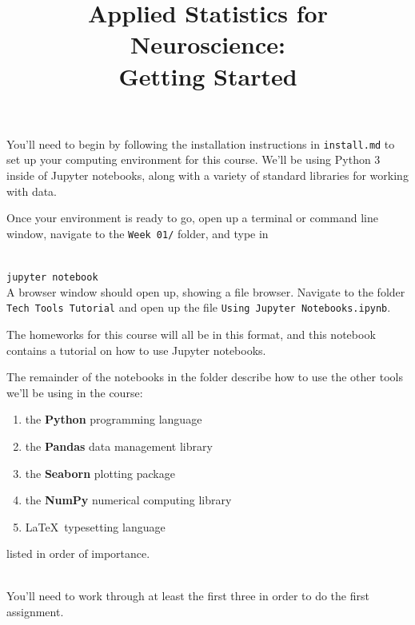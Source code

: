 \documentclass[twoside]{article}
\title{Applied Statistics for Neuroscience:\\
	Getting Started}
\begin{document}
\maketitle

You'll need to begin by following the installation instructions in
\texttt{install.md}
to set up your computing environment for this course.
We'll be using Python 3 inside of Jupyter notebooks,
along with a variety of standard libraries for working with data.

Once your environment is ready to go,
open up a terminal or command line window,
navigate to the \texttt{Week 01/} folder,
and type in

\ \\
\texttt{jupyter notebook}
\ \\

A browser window should open up, showing a file browser.
Navigate to the folder \texttt{Tech Tools Tutorial}
and open up the file
\texttt{Using Jupyter Notebooks.ipynb}.

The homeworks for this course will all be in this format,
and this notebook contains a tutorial on how to use Jupyter notebooks.

The remainder of the notebooks in the folder describe how
to use the other tools we'll be using in the course:

\begin{enumerate}
\item the \textbf{Python} programming language
\item the \textbf{Pandas} data management library
\item the \textbf{Seaborn} plotting package
\item the \textbf{NumPy} numerical computing library
\item \LaTeX \ typesetting language
\end{enumerate}

listed in order of importance.

\ \\

You'll need to work through at least the first three in order
to do the first assignment.
\end{document}
